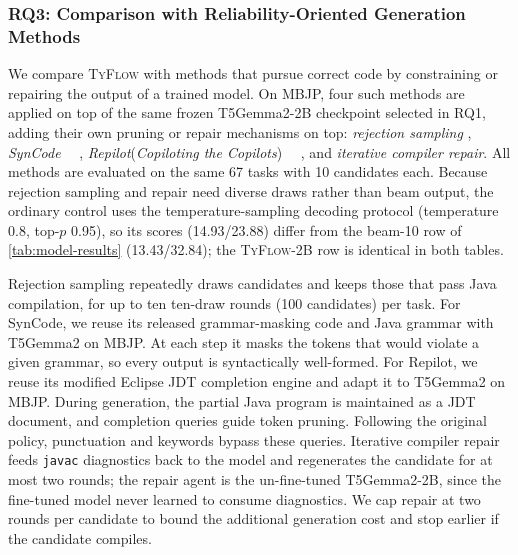 \documentclass[manuscript,screen]{acmart}
\newcommand{\toolname}[1]{\textsc{#1}}
\newcommand{\mainname}{\toolname{TyFlow}\xspace}
\begin{document}
\subsubsection{RQ3: Comparison with    {\color{revblue}Reliability-Oriented Generation Methods} }
  {\color{revblue}We compare }\mainname{} {\color{revblue}with methods that pursue correct code by constraining or repairing the output of a trained model.
On MBJP, four such methods are applied on top of the same frozen T5Gemma2-2B checkpoint selected in RQ1, adding their own pruning or repair mechanisms on top: }\emph{\color{revblue}rejection sampling} ,    \emph{\color{revblue}SynCode}{\color{revblue}~\mbox{%
\cite{ugare2024syncodellmgenerationgrammar}}\hskip0pt%
, }\emph{\color{revblue}Repilot}{\color{revblue}(}\emph{\color{revblue}Copiloting the Copilots}{\color{revblue})~\mbox{%
\cite{DBLP:conf/sigsoft/0003X023}}\hskip0pt%
, and }\emph{\color{revblue}iterative compiler repair}{\color{revblue}.
All methods are evaluated on the same 67 tasks with 10 candidates each.
Because rejection sampling and repair need diverse draws rather than beam output, the ordinary control uses the temperature-sampling decoding protocol (temperature 0.8, top-$p$ 0.95), so its scores (14.93/23.88) differ from the beam-10 row of }\autoref{tab:model-results} {\color{revblue}(13.43/32.84); the }\mainname{\color{revblue}-2B row is identical in both tables.
}

{\color{revblue}Rejection sampling repeatedly draws candidates and keeps those that pass Java compilation, for up to ten ten-draw rounds (100 candidates) per task.
For SynCode, we reuse its released grammar-masking code and Java grammar with T5Gemma2 on MBJP. At each step it masks the tokens that would violate a given grammar, so every output is syntactically well-formed.
For Repilot, we reuse its modified Eclipse JDT completion engine and adapt it to T5Gemma2 on MBJP. During generation, the partial Java program is maintained as a JDT document, and completion queries guide token pruning. Following the original policy, punctuation and keywords bypass these queries.
Iterative compiler repair feeds }\texttt{\color{revblue}javac} {\color{revblue}diagnostics back to the model and regenerates the candidate for at most two rounds; the repair agent is the un-fine-tuned T5Gemma2-2B, since the fine-tuned model never learned to consume diagnostics. We cap repair at two rounds per candidate to bound the additional generation cost and stop earlier if the candidate compiles.
}
\end{document}
